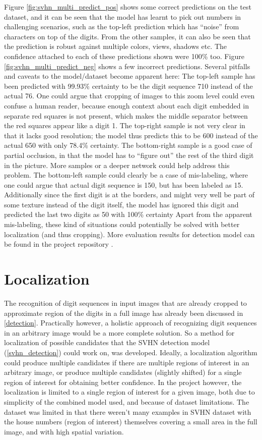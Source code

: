 \documentclass{article}
\begin{document}
	Figure \ref{fig:svhn_multi_predict_pos} shows some correct predictions on the test dataset, and it can be seen that the model has learnt to pick out numbers in challenging scenarios, such as the top-left prediction which has ``noise'' from characters on top of the digits. From the other samples, it can also be seen that the prediction is robust against multiple colors, views, shadows etc. The confidence attached to each of these predictions shown were 100\% too. Figure \ref{fig:svhn_multi_predict_neg} shows a few incorrect predictions. Several pitfalls and caveats to the model/dataset become apparent here: The top-left sample has been predicted with 99.93\% certainty to be the digit sequence 710 instead of the actual 76. One could argue that cropping of images to this zoom level could even confuse a human reader, because enough context about each digit embedded in separate red squares is not present, which makes the middle separator between the red squares appear like a digit 1. The top-right sample is not very clear in that it lacks good resolution; the model thus predicts this to be 600 instead of the actual 650 with only 78.4\% certainty. The bottom-right sample is a good case of partial occlusion, in that the model has to ``figure out'' the rest of the third digit in the picture. More samples or a deeper network could help address this problem. The bottom-left sample could clearly be a case of mis-labeling, where one could argue that actual digit sequence is 150, but has been labeled as 15. Additionally since the first digit is at the borders, and might very well be part of some texture instead of the digit itself, the model has ignored this digit and predicted the last two digits as 50 with 100\% certainty Apart from the apparent mis-labeling, these kind of situations could potentially be solved with better localization (and thus cropping). More evaluation results for detection model can be found in the project repository \cite{svhn-multi-eval}.
	
	\section{Localization}\label{localization}
	The recognition of digit sequences in input images that are already cropped to approximate region of the digits in a full image has already been discussed in \ref{detection}. Practically however, a holistic approach of recognizing digit sequences in an arbitrary image would be a more complete solution. So a method for localization of possible candidates that the SVHN detection model (\ref{svhn_detection}) could work on, was developed. Ideally, a localization algorithm could produce multiple candidates if there are multiple regions of interest in an arbitrary image, or produce multiple candidates (slightly shifted) for a single region of interest for obtaining better confidence. In the project however, the localization is limited to a single region of interest for a given image, both due to simplicity of the combined model used, and because of dataset limitations. The dataset was limited in that there weren't many examples in SVHN dataset with the house numbers (region of interest) themselves covering a small area in the full image, and with high spatial variation.
	
\end{document}

